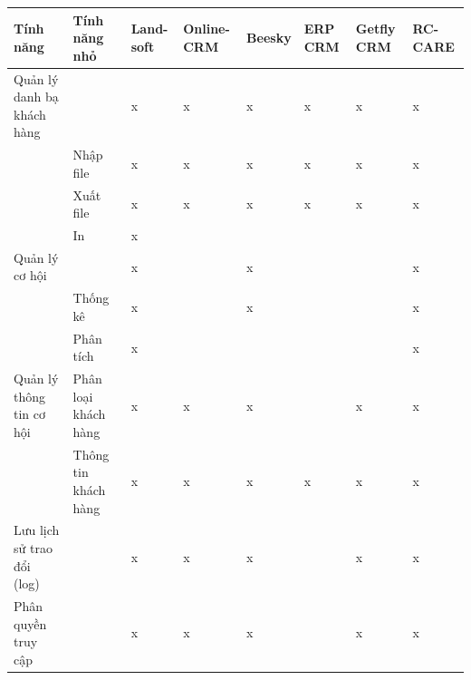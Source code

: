 \documentclass[12pt,a4paper]{article}
\begin{document}
    \begin{longtable}{|
            >{\arraybackslash}m{.15\linewidth}|
            >{\arraybackslash}m{.15\linewidth}|
            >{\centering\arraybackslash}m{.07\linewidth}|
            >{\centering\arraybackslash}m{.1\linewidth}|
            >{\centering\arraybackslash}m{.07\linewidth}|
            >{\centering\arraybackslash}m{.07\linewidth}|
            >{\centering\arraybackslash}m{.07\linewidth}|
            >{\centering\arraybackslash}m{.08\linewidth}|}
        \hline
        \centering Tính năng &
        \centering Tính năng nhỏ &
        Land-\newline soft &
        Online-\newline CRM                                                           &
        Beesky                                                                        &
        ERP CRM                                                                       &
        Getfly CRM                                                                    &
        RC-\newline CARE                                                                                                               \\ \hline
        \endhead
        Quản lý danh bạ khách hàng    &                        & x & x & x & x & x & x \\ \hline
        & Nhập file              & x & x & x & x & x & x \\ \hline
        & Xuất file              & x & x & x & x & x & x \\ \hline
        & In                     & x &   &   &   &   &   \\ \hline
        Quản lý cơ hội                &                        & x &   & x &   &   & x \\ \hline
        & Thống kê               & x &   & x &   &   & x \\ \hline
        & Phân tích              & x &   &   &   &   & x \\ \hline
        Quản lý thông tin cơ hội &
        Phân loại khách hàng &
        x &
        x &
        x &
        &
        x &
        x \\ \hline
        & Thông tin khách hàng   & x & x & x & x & x & x \\ \hline
        Lưu lịch sử trao đổi (log)    &                        & x & x & x &   & x & x \\ \hline
        Phân quyền truy cập           &                        & x & x & x &   & x & x \\ \hline

\end{longtable}
\end{document}
